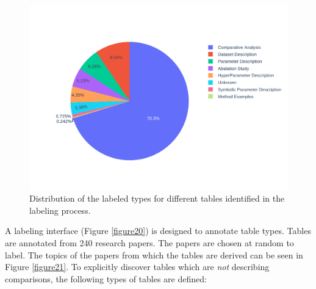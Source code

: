 \begin{figure}[h]
    \centering
    \includegraphics[width=\maxwidth{\textwidth}]{src/images/labeled_intent_distribution.pdf}
    \caption{Distribution of the labeled types for different tables identified in the labeling process.}
    \label{figure\arabic{figurecounter}}
\end{figure}
A labeling interface (Figure \ref{figure20}) is designed to annotate table types. Tables are annotated from 240 research papers. The papers are chosen at random to label. The topics of the papers from which the tables are derived can be seen in Figure \ref{figure21}. To explicitly discover tables which are \textit{not} describing comparisons, the following types of tables are defined: 
